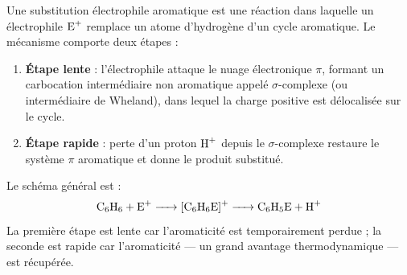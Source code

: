 \documentclass[11pt]{article}
\newcommand{\cle}[1]{{\popxbold\color{popdark}#1}}
\begin{document}
\begin{definition}
Une \cle{substitution électrophile aromatique} est une réaction dans laquelle un électrophile $\ce{E+}$ remplace un atome d'hydrogène d'un cycle aromatique. Le mécanisme comporte deux étapes :
\begin{enumerate}
\item \textbf{Étape lente} : l'électrophile attaque le nuage électronique $\pi$, formant un carbocation intermédiaire non aromatique appelé \cle{$\sigma$-complexe} (ou intermédiaire de Wheland), dans lequel la charge positive est délocalisée sur le cycle.
\item \textbf{Étape rapide} : perte d'un proton $\ce{H+}$ depuis le $\sigma$-complexe restaure le système $\pi$ aromatique et donne le produit substitué.
\end{enumerate}
\end{definition}

Le schéma général est :
\[ \ce{C6H6 + E+ -> [C6H6E]+ -> C6H5E + H+} \]
La première étape est lente car l'aromaticité est temporairement perdue ; la seconde est rapide car l'aromaticité — un grand avantage thermodynamique — est récupérée.
\end{document}
